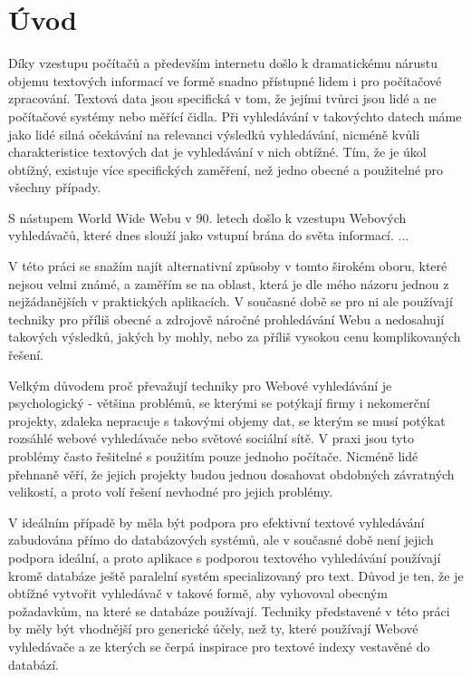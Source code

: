 \documentclass[11pt,letterpaper,oneside,openright]{book}
\begin{document}
\frontmatter
{\hypersetup{hidelinks}
    \tableofcontents
}

\mainmatter
\chapter{Úvod}
Díky vzestupu počítačů a především internetu došlo k dramatickému nárustu
objemu textových informací ve formě snadno přístupné lidem i pro počítačové
zpracování. Textová data jsou specifická v tom, že jejími tvůrci jsou lidé a ne
počítačové systémy nebo měřící čidla. Při vyhledávání v takovýchto datech máme
jako lidé silná očekávání na relevanci výsledků vyhledávání, nicméně kvůli
charakteristice textových dat je vyhledávání v nich obtížné. Tím, že je úkol
obtížný, existuje více specifických zaměření, než jedno obecné a použitelné pro
všechny případy.

S nástupem World Wide Webu v 90. letech došlo k vzestupu Webových vyhledávačů,
které dnes slouží jako vstupní brána do světa informací.
...

V této práci se snažím najít alternativní způsoby v tomto širokém oboru, které
nejsou velmi známé, a zaměřím se na oblast, která je dle mého názoru jednou z
nejžádanějších v praktických aplikacích. V současné době se pro ni ale
používají techniky pro příliš obecné a zdrojově náročné prohledávání Webu a
nedosahují takových výsledků, jakých by mohly, nebo za příliš vysokou cenu
komplikovaných řešení.

Velkým důvodem proč převažují techniky pro Webové vyhledávání je psychologický
- většina problémů, se kterými se potýkají firmy i nekomerční projekty, zdaleka
nepracuje s takovými objemy dat, se kterým se musí potýkat rozsáhlé webové
vyhledávače nebo světové sociální sítě. V praxi jsou tyto problémy často
řešitelné s použitím pouze jednoho počítače. Nicméně lidé přehnaně věří, že
jejich projekty budou jednou dosahovat obdobných závratných velikostí, a proto
volí řešení nevhodné pro jejich problémy.

V ideálním případě by měla být podpora pro efektivní textové vyhledávání
zabudována přímo do databázových systémů, ale v současné době není jejich
podpora ideální, a proto aplikace s podporou textového vyhledávání používají
kromě databáze ještě paralelní systém specializovaný pro text. Důvod je ten, že
je obtížné vytvořit vyhledávač v takové formě, aby vyhovoval obecným
požadavkům, na které se databáze používají. Techniky představené v této práci
by měly být vhodnější pro generické účely, než ty, které používají Webové
vyhledávače a ze kterých se čerpá inspirace pro textové indexy vestavěné do
databází.
\end{document}

